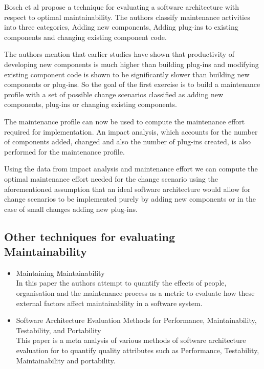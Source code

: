 \documentclass[15pt]{article}
\begin{document}
Bosch et al \cite{bosch_assessing_2001} propose a technique for evaluating a software architecture with respect to optimal maintainability. The authors classify maintenance activities into three categories, Adding new components, Adding plug-ins to existing components and changing existing component code.

The authors mention that earlier studies \cite{henry_quantitative_1997} \cite{maxwell_software_1996} have shown that productivity of developing new components is much higher than building plug-ins and modifying existing component code is shown to be significantly slower than building new components or plug-ins. So the goal of the first exercise is to build a maintenance profile with a set of possible change scenarios classified as adding new components, plug-ins or changing existing components. 

The maintenance profile can now be used to compute the maintenance effort required for implementation. An impact analysis, which accounts for the number of components added, changed and also the number of plug-ins created, is also performed for the maintenance profile. 

Using the data from impact analysis and maintenance effort we can compute the optimal maintenance effort needed for the change scenario using the aforementioned assumption that an ideal software architecture would allow for change scenarios to be implemented purely by adding new components or in the case of small changes adding new plug-ins. 


\subsection{Other techniques for evaluating Maintainability}

\begin{itemize}
\item Maintaining Maintainability \cite{ramage_maintaining_1998}\\
In this paper the authors attempt to quantify the effects of people, organisation and the maintenance process as a metric to evaluate how these external factors affect maintainability in a software system.

\item Software Architecture Evaluation Methods for Performance, Maintainability, Testability, and Portability \cite{mattsson_software_2006}\\
This paper is a meta analysis of various methods of software architecture evaluation for to quantify quality attributes such as Performance, Testability, Maintainability and portability.

\end{itemize}
\end{document}
